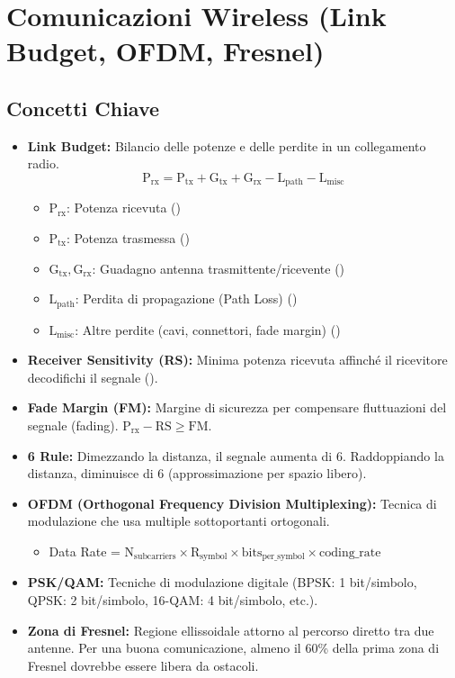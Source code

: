 \section{Comunicazioni Wireless (Link Budget, OFDM, Fresnel)}
\label{sec:wireless}

\subsection{Concetti Chiave}
\begin{itemize}
    \item \textbf{Link Budget:} Bilancio delle potenze e delle perdite in un collegamento radio.
    \[ \text{P}_{\text{rx}} = \text{P}_{\text{tx}} + \text{G}_{\text{tx}} + \text{G}_{\text{rx}} - \text{L}_{\text{path}} - \text{L}_{\text{misc}} \]
    \begin{itemize}
        \item $\text{P}_{\text{rx}}$: Potenza ricevuta ()
        \item $\text{P}_{\text{tx}}$: Potenza trasmessa ()
        \item $\text{G}_{\text{tx}}, \text{G}_{\text{rx}}$: Guadagno antenna trasmittente/ricevente ()
        \item $\text{L}_{\text{path}}$: Perdita di propagazione (Path Loss) ()
        \item $\text{L}_{\text{misc}}$: Altre perdite (cavi, connettori, fade margin) ()
    \end{itemize}
    \item \textbf{Receiver Sensitivity (RS):} Minima potenza ricevuta affinché il ricevitore decodifichi il segnale ().
    \item \textbf{Fade Margin (FM):} Margine di sicurezza per compensare fluttuazioni del segnale (fading). $\text{P}_{\text{rx}} - \text{RS} \ge \text{FM}$.
    \item \textbf{6 Rule:} Dimezzando la distanza, il segnale aumenta di 6. Raddoppiando la distanza, diminuisce di 6 (approssimazione per spazio libero).
    \item \textbf{OFDM (Orthogonal Frequency Division Multiplexing):} Tecnica di modulazione che usa multiple sottoportanti ortogonali.
    \begin{itemize}
        \item Data Rate = $\text{N}_{\text{subcarriers}} \times \text{R}_{\text{symbol}} \times \text{bits}_{\text{per\_symbol}} \times \text{coding\_rate}$
    \end{itemize}
    \item \textbf{PSK/QAM:} Tecniche di modulazione digitale (BPSK: 1 bit/simbolo, QPSK: 2 bit/simbolo, 16-QAM: 4 bit/simbolo, etc.).
    \item \textbf{Zona di Fresnel:} Regione ellissoidale attorno al percorso diretto tra due antenne. Per una buona comunicazione, almeno il 60\% della prima zona di Fresnel dovrebbe essere libera da ostacoli.
\end{itemize}

